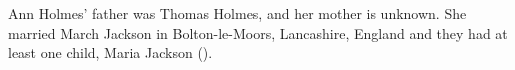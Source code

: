 
Ann Holmes' father was Thomas Holmes, and her mother is unknown.  She married March Jackson in Bolton-le-Moors, Lancashire, England and they had at least one child, Maria Jackson ().

